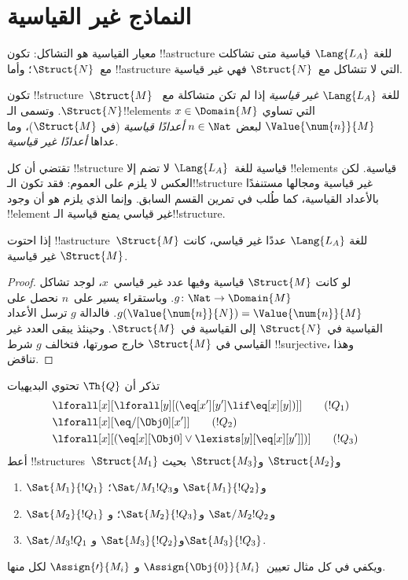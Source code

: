 \documentclass[../../../include/open-logic-section]{subfiles}
\begin{document}
\section{النماذج غير القياسية}

\begin{explain}
معيار القياسية هو التشاكل: تكون !!a{structure} للغة
$\Lang{L_A}$ قياسية متى تشاكلت مع~$\Struct{N}$؛ وأما
!!a{structure} التي لا تتشاكل مع~$\Struct{N}$ فهي غير قياسية.
\end{explain}

\begin{defn}
تكون !!{structure}~$\Struct{M}$ للغة $\Lang{L_A}$ \emph{غير قياسية}
إذا لم تكن متشاكلة مع~$\Struct{N}$. وتسمى الـ!!{element}s
$x \in \Domain{M}$ التي تساوي $\Value{\num{n}}{M}$ لبعض
$n \in \Nat$ \emph{أعدادًا قياسية} (في $\Struct{M}$)، وما عداها
\emph{أعدادًا غير قياسية}.
\end{defn}

\begin{explain}
تقتضي  أن كل !!{structure}
قياسية للغة~$\Lang{L_A}$ لا تضم إلا !!{element}s قياسية.
لكن العكس لا يلزم على العموم: فقد تكون الـ!!{structure}
غير قياسية ومجالها مستنفدًا بالأعداد القياسية، كما طُلب
في تمرين القسم السابق. وإنما الذي يلزم هو أن وجود
!!{element} غير قياسي يمنع قياسية الـ!!{structure}.
\end{explain}

\begin{prop}
إذا احتوت !!a{structure}~$\Struct{M}$ للغة $\Lang{L_A}$ عددًا غير
قياسي، كانت $\Struct{M}$ غير قياسية.
\end{prop}

\begin{proof}
لو كانت $\Struct{M}$ قياسية وفيها عدد غير قياسي~$x$،
لوجد تشاكل $g\colon \Nat \to \Domain{M}$. وباستقراء يسير
على~$n$ نحصل على
$g(\Value{\num{n}}{N})=\Value{\num{n}}{M}$. فالدالة $g$
ترسل الأعداد القياسية في~$\Struct{N}$ إلى القياسية في~$\Struct{M}$.
وحينئذ يبقى العدد غير القياسي في $\Struct{M}$ خارج صورتها،
فتخالف $g$ شرط !!{surjective}، وهذا تناقض.
\end{proof}

\begin{prob}
تذكر أن $\Th{Q}$ تحتوي البديهيات
\begin{align*}
& \lforall[x][\lforall[y][(\eq[x'][y'] \lif \eq[x][y])]] \tag{$!Q_1$}\\
& \lforall[x][\eq/[\Obj 0][x']] \tag{$!Q_2$}\\
& \lforall[x][(\eq[x][\Obj 0] \lor \lexists[y][\eq[x][y']])] \tag{$!Q_3$}
\end{align*}
أعط !!{structure}s~$\Struct{M_1}$ و$\Struct{M_2}$ و$\Struct{M_3}$ بحيث
\begin{enumerate}
\item $\Sat{M_1}{!Q_1}$ و$\Sat{M_1}{!Q_2}$ و$\Sat/{M_1}{!Q_3}$؛
\item $\Sat{M_2}{!Q_1}$ و$\Sat/{M_2}{!Q_2}$ و$\Sat{M_2}{!Q_3}$؛ و
\item $\Sat/{M_3}{!Q_1}$ و$\Sat{M_3}{!Q_2}$ و$\Sat{M_3}{!Q_3}$.
\end{enumerate}
ويكفي في كل مثال تعيين~$\Assign{\Obj{0}}{M_i}$ و
$\Assign{\prime}{M_i}$ لكل منها.
\end{prob}
\end{document}
